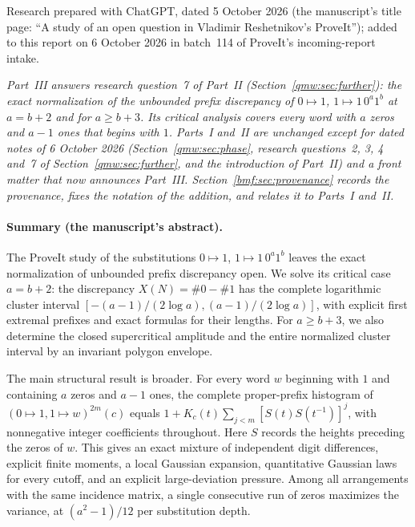 \documentclass[11pt]{article}
\numberwithin{equation}{section}
\theoremstyle{definition}
\theoremstyle{remark}
\begin{document}
\par\smallskip
\noindent Research prepared with ChatGPT, dated 5 October 2026 (the
manuscript's title page: ``A study of an open question in Vladimir
Reshetnikov's ProveIt''); added to this report on 6 October 2026 in
batch~114 of ProveIt's incoming-report intake.\par\medskip

\noindent\emph{Part~III answers research question~7 of Part~II
(Section~\ref{qmw:sec:further}): the exact normalization of the unbounded
prefix discrepancy of $0\mapsto1$, $1\mapsto1\,0^a1^b$ at $a=b+2$ and for
$a\geq b+3$. Its critical analysis covers every word with $a$ zeros and
$a-1$ ones that begins with $1$. Parts~I and~II are unchanged except for dated
notes of 6 October 2026 (Section~\ref{qmw:sec:phase}, research
questions~2, 3, 4 and~7 of Section~\ref{qmw:sec:further}, and the
introduction of Part~II) and a front matter that now announces Part~III.
Section~\ref{bmf:sec:provenance} records the provenance, fixes the notation
of the addition, and relates it to Parts~I and~II.}

\paragraph{Summary (the manuscript's abstract).}
The ProveIt study of the substitutions
$0\mapsto1$, $1\mapsto1\,0^a1^b$ leaves the exact normalization of
unbounded prefix discrepancy open. We solve its critical case
$a=b+2$: the discrepancy $X(N)=\#0-\#1$ has the complete logarithmic
cluster interval
$[-(a-1)/(2\log a),(a-1)/(2\log a)]$, with explicit first extremal
prefixes and exact formulas for their lengths. For $a\geq b+3$,
we also determine the closed supercritical amplitude and the
entire normalized cluster interval by an invariant polygon envelope.

The main structural result is broader. For every word $w$ beginning
with $1$ and containing $a$ zeros and $a-1$ ones, the complete
proper-prefix histogram of $(0\mapsto1,1\mapsto w)^{2m}(c)$ equals
$1+K_c(t)\sum_{j<m}[S(t)S(t^{-1})]^j$, with nonnegative integer
coefficients throughout. Here $S$ records the heights preceding the
zeros of $w$. This gives an exact mixture of independent digit
differences, explicit finite moments, a local Gaussian expansion,
quantitative Gaussian laws for every cutoff, and an explicit
large-deviation pressure. Among all arrangements with the same
incidence matrix, a single consecutive run of zeros maximizes the
variance, at $(a^2-1)/12$ per substitution depth.
\end{document}
